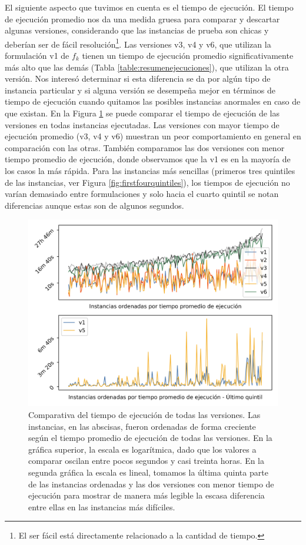 El siguiente aspecto que tuvimos en cuenta es el tiempo de ejecución. El tiempo de ejecución promedio nos da una medida gruesa para comparar y descartar algunas versiones, considerando que las instancias de prueba son chicas y deberían ser de fácil resolución\footnote{El ser fácil está directamente relacionado a la cantidad de tiempo.}. Las versiones v3, v4 y v6, que utilizan la formulación v1 de $f_k$ tienen un tiempo de ejecución promedio significativamente más alto que las demás (Tabla \ref{table:resumenejecuciones}), que utilizan la otra versión. Nos interesó determinar si esta diferencia se da por algún tipo de instancia particular y si alguna versión se desempeña mejor en términos de tiempo de ejecución cuando quitamos las posibles instancias anormales en caso de que existan. En la Figura \ref{fig:runtimecomparison} se puede comparar el tiempo de ejecución de las versiones en todas instancias ejecutadas. Las versiones con mayor tiempo de ejecución promedio (v3, v4 y v6) muestran un peor comportamiento en general en comparación con las otras. También comparamos las dos versiones con menor tiempo promedio de ejecución, donde observamos que la v1 es en la mayoría de los casos la más rápida. Para las instancias más sencillas (primeros tres quintiles de las instancias, ver Figura \ref{fig:firstfourquintiles}), los tiempos de ejecución no varían demasiado entre formulaciones y solo hacia el cuarto quintil se notan diferencias aunque estas son de algunos segundos.

\begin{figure}[h!]
  \centering
  \includegraphics[width=12cm]{../resources/run_time_comparison.png}
  \caption{Comparativa del tiempo de ejecución de todas las versiones. Las instancias, en las abscisas, fueron ordenadas de forma creciente según el tiempo promedio de ejecución de todas las versiones. En la gráfica superior, la escala es logarítmica, dado que los valores a comparar oscilan entre pocos segundos y casi treinta horas. En la segunda gráfica la escala es lineal, tomamos la última quinta parte de las instancias ordenadas y las dos versiones con menor tiempo de ejecución para mostrar de manera más legible la escasa diferencia entre ellas en las instancias más difíciles.}
  \label{fig:runtimecomparison}
\end{figure}

